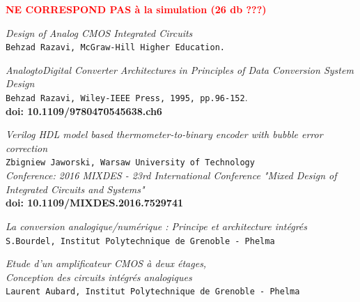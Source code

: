 \documentclass[11pt]{article}
\begin{document}
\textbf{\textcolor{red}{NE CORRESPOND PAS \`a la simulation (26 db ???)}}

\clearpage


\begin{thebibliography}{9}
\textit{Design of Analog CMOS Integrated Circuits}
\\\texttt{Behzad Razavi, McGraw-Hill Higher Education.}

\textit{AnalogtoDigital Converter Architectures}
\textit{in Principles of Data Conversion System Design}\\
\texttt{Behzad Razavi, Wiley-IEEE Press, 1995, pp.96-152}.\\
\textbf{doi: 10.1109/9780470545638.ch6}

\textit{Verilog HDL model based thermometer-to-binary encoder with bubble error correction}\\
\texttt{Zbigniew Jaworski, Warsaw University of Technology}\\
\textit{Conference: 2016 MIXDES - 23rd International Conference "Mixed Design of Integrated Circuits and Systems"}\\
\textbf{doi: 10.1109/MIXDES.2016.7529741}

\textit{La conversion analogique/num\'erique : Principe et architecture int\'egr\'es}\\
\texttt{S.Bourdel, Institut Polytechnique de Grenoble - Phelma}

\textit{Etude d'un amplificateur CMOS \`a deux \'etages,}\\
\textit{Conception des circuits int\'egr\'es analogiques}\\
\texttt{Laurent Aubard, Institut Polytechnique de Grenoble - Phelma}

\end{thebibliography}
\end{document}
